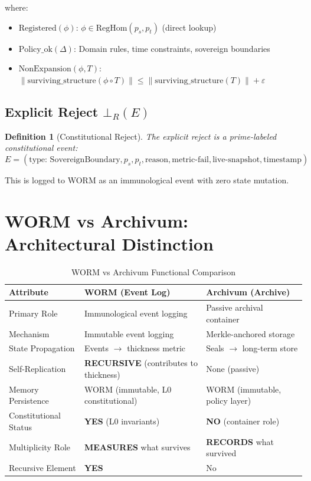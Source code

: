 \documentclass[11pt,a4paper]{article}
\newtheorem{definition}[theorem]{Definition}
\begin{document}
where:
\begin{itemize}
    \item $\text{Registered}(\phi)$: $\phi \in \text{RegHom}(p_s, p_t)$ (direct lookup)
    \item $\text{Policy\_ok}(\Delta)$: Domain rules, time constraints, sovereign boundaries
    \item $\text{NonExpansion}(\phi, T)$: $\|\text{surviving\_structure}(\phi \circ T)\| \leq \|\text{surviving\_structure}(T)\| + \varepsilon$
\end{itemize}

\subsection{Explicit Reject $\bot_R(E)$}

\begin{definition}[Constitutional Reject]\label{def:reject}
The explicit reject is a prime-labeled constitutional event:
$$E = (\text{type: SovereignBoundary}, p_s, p_t, \text{reason}, \text{metric-fail}, \text{live-snapshot}, \text{timestamp})$$
\end{definition}

This is logged to WORM as an immunological event with zero state mutation.

\section{WORM vs Archivum: Architectural Distinction}

\begin{table}[h]
\centering
\caption{WORM vs Archivum Functional Comparison}
\label{tab:worm_archivum}
\begin{tabular}{@{}l l l@{}}
\toprule
\textbf{Attribute} & \textbf{WORM (Event Log)} & \textbf{Archivum (Archive)} \\
\midrule
Primary Role & Immunological event logging & Passive archival container \\
Mechanism & Immutable event logging & Merkle-anchored storage \\
State Propagation & Events $\to$ thickness metric & Seals $\to$ long-term store \\
Self-Replication & \textbf{RECURSIVE} (contributes to thickness) & None (passive) \\
Memory Persistence & WORM (immutable, L0 constitutional) & WORM (immutable, policy layer) \\
Constitutional Status & \textbf{YES} (L0 invariants) & \textbf{NO} (container role) \\
Multiplicity Role & \textbf{MEASURES} what survives & \textbf{RECORDS} what survived \\
Recursive Element & \textbf{YES} & No \\
\bottomrule
\end{tabular}
\end{table}
\end{document}
